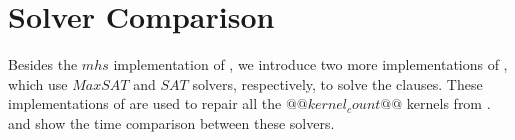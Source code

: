 \section{Solver Comparison}

Besides the $mhs$ implementation of \tool, we introduce two more implementations of \tool, which use $MaxSAT$ and $SAT$ solvers, respectively, to solve the clauses. These implementations of \tool are used to repair all the $@@kernel_count@@$ kernels from .  and  show the time comparison between these solvers.


